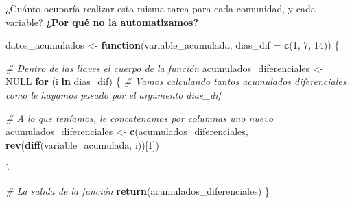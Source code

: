 \documentclass[11pt,]{book}
\newenvironment{Shaded}{\begin{snugshade}}{\end{snugshade}}
\newcommand{\CommentTok}[1]{\textcolor[rgb]{0.37,0.37,0.37}{\textit{#1}}}
\newcommand{\ControlFlowTok}[1]{\textcolor[rgb]{0.27,0.27,0.27}{\textbf{#1}}}
\newcommand{\DataTypeTok}[1]{\textcolor[rgb]{0.27,0.27,0.27}{#1}}
\newcommand{\DecValTok}[1]{\textcolor[rgb]{0.06,0.06,0.06}{#1}}
\newcommand{\KeywordTok}[1]{\textcolor[rgb]{0.27,0.27,0.27}{\textbf{#1}}}
\newcommand{\NormalTok}[1]{#1}
\newcommand{\OperatorTok}[1]{\textcolor[rgb]{0.43,0.43,0.43}{\textbf{#1}}}
\newcommand{\OtherTok}[1]{\textcolor[rgb]{0.37,0.37,0.37}{#1}}
\newcommand{\StringTok}[1]{\textcolor[rgb]{0.5,0.5,0.5}{#1}}
\begin{document}
\begin{Shaded}
\end{Shaded}

¿Cuánto ocuparía realizar esta misma tarea para cada comunidad, y cada variable? \textbf{¿Por qué no la automatizamos?}

\begin{Shaded}
\begin{Highlighting}[]
\NormalTok{datos_acumulados <-}\StringTok{ }\ControlFlowTok{function}\NormalTok{(variable_acumulada, }\DataTypeTok{dias_dif =} \KeywordTok{c}\NormalTok{(}\DecValTok{1}\NormalTok{, }\DecValTok{7}\NormalTok{, }\DecValTok{14}\NormalTok{)) \{}
  
  \CommentTok{# Dentro de las llaves el cuerpo de la función}
\NormalTok{  acumulados_diferenciales <-}\StringTok{ }\OtherTok{NULL}
  \ControlFlowTok{for}\NormalTok{ (i }\ControlFlowTok{in}\NormalTok{ dias_dif) \{ }\CommentTok{# Vamos calculando tantos acumulados diferenciales como le hayamos pasado por el argumento dias_dif}
    
    \CommentTok{# A lo que teníamos, le concatenamos por columnas uno nuevo}
\NormalTok{    acumulados_diferenciales <-}\StringTok{ }\KeywordTok{c}\NormalTok{(acumulados_diferenciales,}
                                  \KeywordTok{rev}\NormalTok{(}\KeywordTok{diff}\NormalTok{(variable_acumulada, i))[}\DecValTok{1}\NormalTok{])}
  
\NormalTok{  \}}
  
  \CommentTok{# La salida de la función}
  \KeywordTok{return}\NormalTok{(acumulados_diferenciales)}
\NormalTok{\}}
\end{Highlighting}
\end{Shaded}
\end{document}
